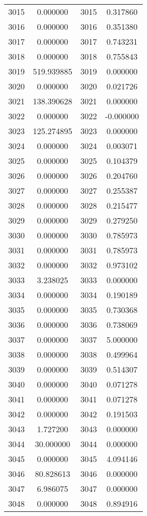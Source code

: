 \documentclass[12pt]{article}
\begin{document}
\begin{longtable}{@{}cccc@{}}
3015 & 0.000000 & 3015 & 0.317860 \\
3016 & 0.000000 & 3016 & 0.351380 \\
3017 & 0.000000 & 3017 & 0.743231 \\
3018 & 0.000000 & 3018 & 0.755843 \\
3019 & 519.939885 & 3019 & 0.000000 \\
3020 & 0.000000 & 3020 & 0.021726 \\
3021 & 138.390628 & 3021 & 0.000000 \\
3022 & 0.000000 & 3022 & -0.000000 \\
3023 & 125.274895 & 3023 & 0.000000 \\
3024 & 0.000000 & 3024 & 0.003071 \\
3025 & 0.000000 & 3025 & 0.104379 \\
3026 & 0.000000 & 3026 & 0.204760 \\
3027 & 0.000000 & 3027 & 0.255387 \\
3028 & 0.000000 & 3028 & 0.215477 \\
3029 & 0.000000 & 3029 & 0.279250 \\
3030 & 0.000000 & 3030 & 0.785973 \\
3031 & 0.000000 & 3031 & 0.785973 \\
3032 & 0.000000 & 3032 & 0.973102 \\
3033 & 3.238025 & 3033 & 0.000000 \\
3034 & 0.000000 & 3034 & 0.190189 \\
3035 & 0.000000 & 3035 & 0.730368 \\
3036 & 0.000000 & 3036 & 0.738069 \\
3037 & 0.000000 & 3037 & 5.000000 \\
3038 & 0.000000 & 3038 & 0.499964 \\
3039 & 0.000000 & 3039 & 0.514307 \\
3040 & 0.000000 & 3040 & 0.071278 \\
3041 & 0.000000 & 3041 & 0.071278 \\
3042 & 0.000000 & 3042 & 0.191503 \\
3043 & 1.727200 & 3043 & 0.000000 \\
3044 & 30.000000 & 3044 & 0.000000 \\
3045 & 0.000000 & 3045 & 4.094146 \\
3046 & 80.828613 & 3046 & 0.000000 \\
3047 & 6.986075 & 3047 & 0.000000 \\
3048 & 0.000000 & 3048 & 0.894916 \\

\end{longtable}
\end{document}
